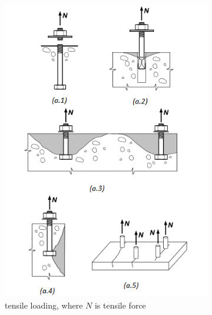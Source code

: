 \begin{figure}
	\centering
	\begin{subfigure}{.5\textwidth}
		\centering
		\includegraphics[width=.9\linewidth]{obrazky/failure_models_tensile.png}
		\caption{tensile loading, where $N$ is tensile force}
		\label{obr:tensile_loaded}
	\end{subfigure}%
	\begin{subfigure}{.5\textwidth}
		\centering

\end{subfigure}
\end{figure}
